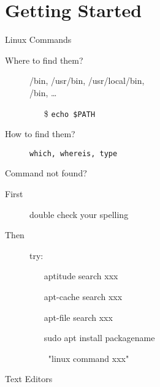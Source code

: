 \section{Getting Started}
\label{sec:start}

\begin{frame}{Linux Commands}
  \begin{description}
  \item[Where to find them?] {\ttfamily /bin, /usr/bin, /usr/local/bin,\\/bin,
      \ldots}
    \begin{itemize}
    \item[\$] \texttt{echo \$PATH}
    \end{itemize}
  \item[How to find them?] \texttt{which, whereis, type}
  \end{description}
  \begin{block}{Command not found?}
    \begin{description}
    \item[First] double check your spelling
    \item[Then] try:{\ttfamily
      \begin{itemize}
      \item[\debian] aptitude search xxx
      \item[\debian] apt-cache search xxx
      \item[\debian] apt-file search xxx
      \item[\debian] sudo apt install packagename
      \item[\GG] \google~"linux command xxx"
      \end{itemize}}
    \end{description}
  \end{block}
\end{frame}

\begin{frame}{Text Editors}
  \begin{block}
    {
    }
    \begin{center}
    \end{center}
  \end{block}
\end{frame}

